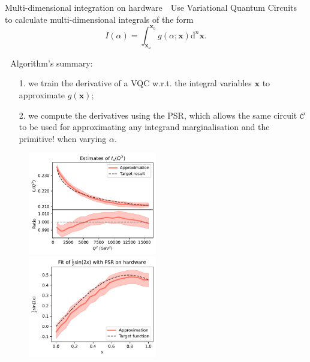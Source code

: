 \documentclass[8pt, xcolor={svgnames}, hyperref={linkcolor=black}]{beamer}
\begin{document}

\begin{frame}{Multi-dimensional integration on hardware}
\small
\faCrosshairs\,\, Use Variational Quantum Circuits to calculate multi-dimensional 
integrals of the form
\begin{equation}
I(\alpha) = \int_{\bm{x}_a}^{\bm{x}_b} g(\alpha; \bm{x}) \text{d}^n \bm{x}.
\label{eq:integral}
\end{equation}

\faFlash\,\, Algorithm's summary:
\begin{itemize}[noitemsep]
\item[1.] we train the derivative of a VQC w.r.t. the integral variables $\bm{x}$ to approximate $g(\bm{x})$;
\item[2.] we compute the derivatives using the PSR, which allows the same circuit 
$\mathcal{C}$ to be used for approximating any integrand 
marginalisation and the primitive!
when varying $\alpha$.
\end{itemize}
\begin{figure}  
    \includegraphics[width=0.5\textwidth]{figures/uquark2d.pdf}%
    \includegraphics[width=0.5\textwidth]{figures/hardware_int.pdf}
\end{figure}
\end{frame}
\end{document}
